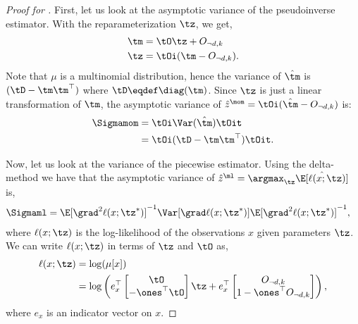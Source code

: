 \begin{proof}[Proof for ]
  First, let us look at the
  asymptotic variance of the pseudoinverse estimator. With the
  reparameterization $\tz$, we get,
  \begin{align*}
    \tm &= \tO \tz +  O_{\neg d,k} \\
    \tz &= \tOi (\tm - O_{\neg d,k}).
  \end{align*}
  Note that $\mu$ is a multinomial distribution, hence the variance of
    $\hat\tm$ is $(\tD - \tm \tm^\top)$ where $\tD \eqdef \diag(\tm)$.
  Since $\tz$ is just a linear transformation of $\tm$,
  the asymptotic variance of $\hat{z}^\mom = \tOi (\hat\tm - O_{\neg d,k})$ is:
  \begin{align*}
      \Sigmamom &= \tOi \Var(\hat\tm) \tOit \\
      &= \tOi (\tD - \tm \tm^\top) \tOit.
  \end{align*}
  
  Now, let us look at the variance of the piecewise estimator.  Using
  the delta-method \cite{vaart98asymptotic} we have that the asymptotic
  variance of 
  $\hat{z}^\ml = \argmax_{\tz} \hat\E[\ell(x ; \tz)]$ is,
  \begin{align*}
    \Sigmaml &= \E[\grad^2 \ell(x ; \tz^*)]^{-1} \Var[\grad \ell(x ; \tz^*)] \E[\grad^2 \ell(x ; \tz^*)]^{-1},
  \end{align*}
  where $\ell(x;\tz)$ is the log-likelihood of the observations $x$
  given parameters $\tz$. We can write $\ell(x;\tz)$ in terms of $\tz$
  and $\tO$ as,
  \begin{align*}
    \ell(x;\tz) 
              &= \log( \mu[x] ) \\
              &= \log \left( 
    e_x^\top \begin{bmatrix}
      \tO \\
      - \ones^\top\tO
    \end{bmatrix} \tz 
    + 
    e_x^\top \begin{bmatrix}
      O_{\neg d, k} \\
      1 - \ones^\top O_{\neg d, k}
    \end{bmatrix}
    \right),
  \end{align*}
where $e_x$ is an indicator vector on $x$.


\end{proof}
